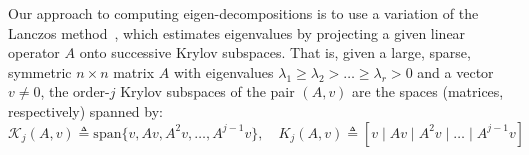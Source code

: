 \documentclass[10pt]{article}
\numberwithin{equation}{section}
\newcommand{\+}{%
	\raisebox{0.18ex}{\scaleobj{0.55}{+}}
}
\theoremstyle{definition}
\theoremstyle{definition}
\begin{document}


Our approach to computing eigen-decompositions is to use a variation of the Lanczos method~\cite{lanczos1950iteration}, which estimates eigenvalues by projecting a given linear operator $A$ onto successive Krylov subspaces. 
That is, given a large, sparse, symmetric $n \times n$ matrix $A$ with eigenvalues $\lambda_1 \geq \lambda_2 > \dots \geq \lambda_r > 0$ and a vector $v \neq 0$, the order-$j$ Krylov subspaces of the pair $(A, v)$ are the spaces (matrices, respectively) spanned by: 
\begin{equation}
	\mathcal{K}_j(A, v) \triangleq \mathrm{span}\{ v, Av, A^2 v, \dots, A^{j-1}v \}, \quad K_j(A, v) \triangleq [ v \mid Av \mid A^2 v \mid \dots \mid A^{j-1}v]
\end{equation}
\end{document}
